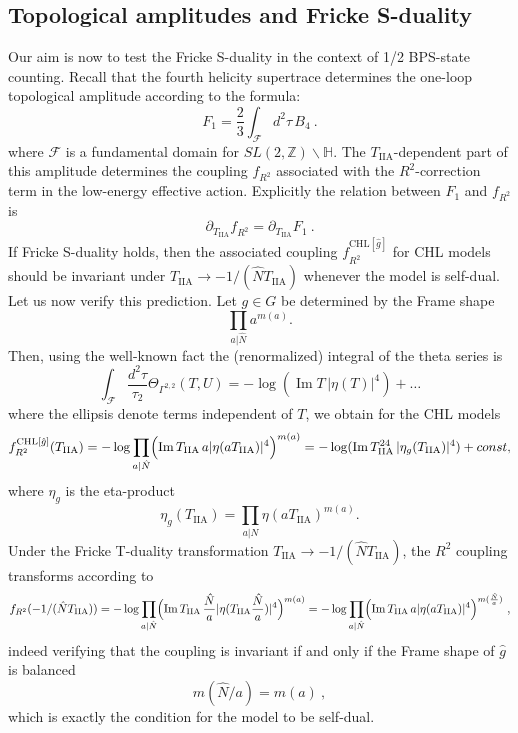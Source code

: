 \documentclass[a4paper,11pt]{article}
\newcommand{\F}{\mathcal{F}}
\DeclareMathOperator{\im}{Im}
\numberwithin{equation}{section}
\def\be{\begin{equation}}
\def\ee{\end{equation}}
\begin{document}
\subsection{Topological amplitudes and Fricke S-duality}
Our aim is now to test the Fricke S-duality in the context of 1/2 BPS-state counting. Recall that the fourth helicity supertrace determines the one-loop topological amplitude according to the formula:
\be
F_1=\frac{2}{3}\int_{\F} d^2\tau\, B_4 \ .
\ee  
where $\mathcal{F}$ is a fundamental domain for $SL(2,\mathbb{Z})\backslash \mathbb{H}$. The $T_{\text{IIA}}$-dependent part of this amplitude determines the coupling $f_{R^2}$ associated with the $R^2$-correction term in the low-energy effective action. Explicitly the relation between $F_1$ and $f_{R^2}$ is \cite{Gregori:1997hi}
\be \partial_{T_{\text{IIA}}} f_{R^2} = \partial_{T_{\text{IIA}}} F_1\ .
\ee 
If Fricke S-duality holds, then the associated coupling $f^{\text{CHL}[\hat g]}_{R^2}$ for CHL models should be invariant under $T_{\text{IIA}}\to -1/(\hat{N} T_{\text{IIA}})$ whenever the model is self-dual. Let us now verify this prediction. 
Let $g\in G$ be determined by the Frame shape
\be
\prod_{a|\hat{N}} a^{m(a)}.
\ee
Then, using the well-known fact the (renormalized) integral of the theta series is
\be
\int_{\F} \frac{d^2\tau}{\tau_2} \Theta_{\Gamma^{2,2}}(T,U)=-\log(\im T\,|\eta(T)|^4)+\ldots \ee 
where the ellipsis denote terms independent of $T$, we obtain for the CHL models
\be f^{\text{CHL}[\hat g]}_{R^2}(T_{\text{IIA}})=-\log\prod_{a|\hat N} \Bigl(\im T_{\text{IIA}}\,a|\eta(aT_{\text{IIA}})|^4\Bigr)^{m(a)}=-\log (\im T_{\text{IIA}}^{24}\,|\eta_g(T_{\text{IIA}})|^4)+const,
\label{R2couplingCHL}
\ee
where $\eta_g$ is the eta-product
\be
\eta_g(T_{\text{IIA}})=\prod_{a|N}\eta(aT_{\text{IIA}})^{m(a)}.
\ee
Under the Fricke T-duality transformation $T_{\text{IIA}}\to -1/(\hat N T_{\text{IIA}})$, the $R^2$ coupling transforms according to
\be f_{R^2}(-1/(\hat{N}T_{\text{IIA}}))=-\log\prod_{a|\hat N} \Bigl(\im T_{\text{IIA}} \,\frac{\hat N}{a}|\eta(T_{\text{IIA}}\frac{\hat N}{a})|^4\Bigr)^{m(a)}=-\log\prod_{a|\hat N} \Bigl(\im T_{\text{IIA}}\,a|\eta(aT_{\text{IIA}})|^4\Bigr)^{m(\frac{\hat N}{a})}\ ,
\ee 
indeed verifying that the coupling is invariant if and only if the Frame shape of $\hat g$ is balanced
\be m(\hat N/a)=m(a)\ ,
\ee which is exactly the condition for the model to be self-dual.

\end{document}
